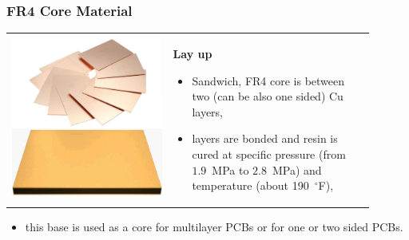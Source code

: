 \documentclass{beamer}
\begin{document}
	\begin{frame}
    \frametitle{FR4 Core Material}

		\begin{center}
			\begin{tabular}{m{0.4\linewidth} m{0.5\linewidth}}
			\includegraphics[scale=0.12]{obr02_jadro.png} & \textbf{Lay up}
			\begin{itemize}
				\item Sandwich, FR4 core is between two (can be also one sided) Cu layers,
				\item layers are bonded and resin is cured at specific pressure (from $1.9$~MPa to $2.8$~MPa) and temperature (about 190~$^\circ$F),
			\end{itemize}
			\end{tabular}
		\end{center}
		
		\begin{itemize}
			\item this base is used as a core for multilayer PCBs or for one or two sided PCBs.
		\end{itemize}
	\end{frame}
\end{document}
